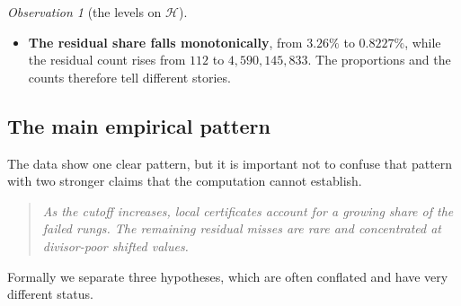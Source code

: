 \documentclass[11pt]{article}
\theoremstyle{definition}
\theoremstyle{remark}
\newtheorem{observation}[theorem]{Observation}
\begin{document}
\begin{observation}[the levels on $\mathcal{H}$]
\begin{itemize}
admissible support subgroup $H = \langle 2 \bmod 51 \rangle$. The six level-RC failures
at $r=123$ confirm that this admissible rung is reached and can fail for local reasons,
but no level-S failure occurs there. For that to happen, the unique admissible subgroup
at $r=123$ would have to occur as the actual support subgroup, which appears to be rare.
\item \textbf{The residual share falls monotonically}, from $3.26\%$ to $0.8227\%$,
while the residual count rises from $112$ to $4{,}590{,}145{,}833$. The proportions and
the counts therefore tell different stories.
\end{itemize}
\end{observation}

\subsection{The main empirical pattern}\label{sec:thesis}

The data show one clear pattern, but it is important not to confuse that pattern with
two stronger claims that the computation cannot establish.

\begin{quote}
\emph{As the cutoff increases, local certificates account for a growing share of the
failed rungs. The remaining residual misses are rare and concentrated at divisor-poor
shifted values.}
\end{quote}

Formally we separate three hypotheses, which are often conflated and have very
different status.
\end{document}
